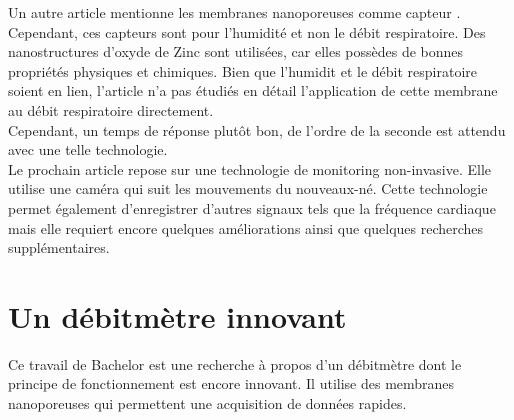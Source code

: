 Un autre article mentionne les membranes nanoporeuses comme capteur \cite{moharamzadeh_fabrication_2018}. Cependant, ces capteurs sont pour l'humidité et non le débit 
respiratoire. Des nanostructures d'oxyde de Zinc sont utilisées, car elles possèdes de bonnes propriétés physiques et chimiques. Bien que l'humidit 
et le débit respiratoire soient en lien, l'article n'a pas étudiés en détail l'application de cette membrane au débit respiratoire directement. \\
Cependant, un temps de réponse plutôt bon, de l'ordre de la seconde est attendu avec une telle technologie. \\

Le prochain article repose sur une technologie de monitoring non-invasive. Elle utilise une caméra qui suit les mouvements du nouveaux-né. 
Cette technologie permet également d'enregistrer d'autres signaux tels que la fréquence cardiaque mais elle requiert encore quelques améliorations 
ainsi que quelques recherches supplémentaires. 


\section{Un débitmètre innovant}
Ce travail de Bachelor est une recherche à propos d'un débitmètre dont le principe de fonctionnement est encore innovant. Il utilise des 
membranes nanoporeuses qui permettent une acquisition de données rapides. 

